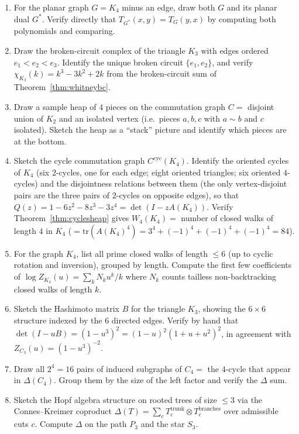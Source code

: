 \begin{enumerate}[resume]
\item For the planar graph $G = K_4$ minus an edge, draw both $G$ and its
planar dual $G^*$. Verify directly that $T_{G^*}(x, y) = T_G(y, x)$
by computing both polynomials and comparing.

\item Draw the broken-circuit complex of the triangle $K_3$ with edges
ordered $e_1 < e_2 < e_3$. Identify the unique broken circuit
$\{e_1, e_2\}$, and verify
$\chi_{K_3}(k) = k^3 - 3k^2 + 2k$ from the broken-circuit sum of
Theorem~\ref{thm:whitneybc}.

\item Draw a sample heap of $4$ pieces on the commutation graph
$C = $ disjoint union of $K_2$ and an isolated vertex (i.e.\ pieces
$a, b, c$ with $a \sim b$ and $c$ isolated). Sketch the heap as a
``stack'' picture and identify which pieces are at the bottom.

\item Sketch the cycle commutation graph $C^{\mathrm{cyc}}(K_4)$. Identify
the oriented cycles of $K_4$ (six $2$-cycles, one for each edge; eight
oriented triangles; six oriented $4$-cycles) and the disjointness
relations between them (the only vertex-disjoint pairs are the three
pairs of $2$-cycles on opposite edges), so that
$Q(z) = 1 - 6z^2 - 8z^3 - 3z^4 = \det(I - zA(K_4))$. Verify Theorem~\ref{thm:cyclesheap}
gives $W_4(K_4) = $ number of closed walks of length $4$ in $K_4$
($= \mathrm{tr}(A(K_4)^4) = 3^4 + (-1)^4 + (-1)^4 + (-1)^4 = 84$).

\item For the graph $K_4$, list all prime closed walks of length $\le 6$
(up to cyclic rotation and inversion), grouped by length. Compute the
first few coefficients of $\log Z_{K_4}(u) = \sum_k N_k u^k / k$
where $N_k$ counts tailless non-backtracking closed walks of length $k$.

\item Sketch the Hashimoto matrix $B$ for the triangle $K_3$, showing the
$6 \times 6$ structure indexed by the $6$ directed edges. Verify by
hand that $\det(I - uB) = (1 - u^3)^2 = (1 - u)^2 (1 + u + u^2)^2$,
in agreement with $Z_{C_3}(u) = (1 - u^3)^{-2}$.

\item Draw all $2^4 = 16$ pairs of induced subgraphs of $C_4 = $ the $4$-cycle that
appear in $\Delta(C_4)$. Group them by the size of the left factor and
verify the $\Delta$ sum.

\item Sketch the Hopf algebra structure on rooted trees of size $\le 3$ via
the Connes--Kreimer coproduct $\Delta(T) = \sum_c T_c^{\mathrm{trunk}} \otimes T_c^{\mathrm{branches}}$
over admissible cuts $c$. Compute $\Delta$ on the path $P_3$ and the
star $S_3$.


\end{enumerate}
